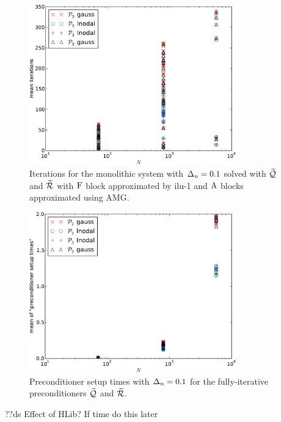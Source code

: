 \begin{figure}
  \centering
  \includegraphics[width=0.8\textwidth]{plots/linear_solvers_p2p3/implicitilu-1-meanofnsolveritersvsinitialnnode.pdf}
  \caption{Iterations for the monolithic system with $\Delta_{n}=0.1$ solved with $\widetilde{\mathcal{Q}}$ and $\widetilde{\mathcal{R}}$ with $\mathrm{F}$ block approximated by ilu-1 and $\mathrm{A}$ blocks approximated using AMG.}
  \label{fig:its-p23-ilu1}
\end{figure}

\begin{figure}
  \centering
  \includegraphics[width=0.8\textwidth]{plots/linear_solvers_p2p3/implicitilu-1-meanofpreconditionersetuptimesvsinitialnnode.pdf}
  \caption{Preconditioner setup times with $\Delta_{n}=0.1$ for the fully-iterative preconditioners $\widetilde{\mathcal{Q}}$ and $\widetilde{\mathcal{R}}$.}
  \label{fig:times-p23-ilu1}
\end{figure}

??ds Effect of HLib? If time do this later


